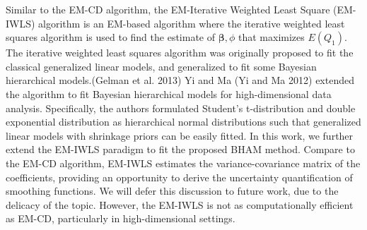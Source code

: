\documentclass[
]{article}
\begin{document}
Similar to the EM-CD algorithm, the EM-Iterative Weighted Least Square
(EM-IWLS) algorithm is an EM-based algorithm where the iterative
weighted least squares algorithm is used to find the estimate of
\(\boldsymbol{\beta}, \phi\) that maximizes \(E(Q_1)\). The iterative
weighted least squares algorithm was originally proposed to fit the
classical generalized linear models, and generalized to fit some
Bayesian hierarchical models.(Gelman et al. 2013) Yi and Ma (Yi and Ma
2012) extended the algorithm to fit Bayesian hierarchical models for
high-dimensional data analysis. Specifically, the authors formulated
Student's t-distribution and double exponential distribution as
hierarchical normal distributions such that generalized linear models
with shrinkage priors can be easily fitted. In this work, we further
extend the EM-IWLS paradigm to fit the proposed BHAM method. Compare to
the EM-CD algorithm, EM-IWLS estimates the variance-covariance matrix of
the coefficients, providing an opportunity to derive the uncertainty
quantification of smoothing functions. We will defer this discussion to
future work, due to the delicacy of the topic. However, the EM-IWLS is
not as computationally efficient as EM-CD, particularly in
high-dimensional settings.
\end{document}
